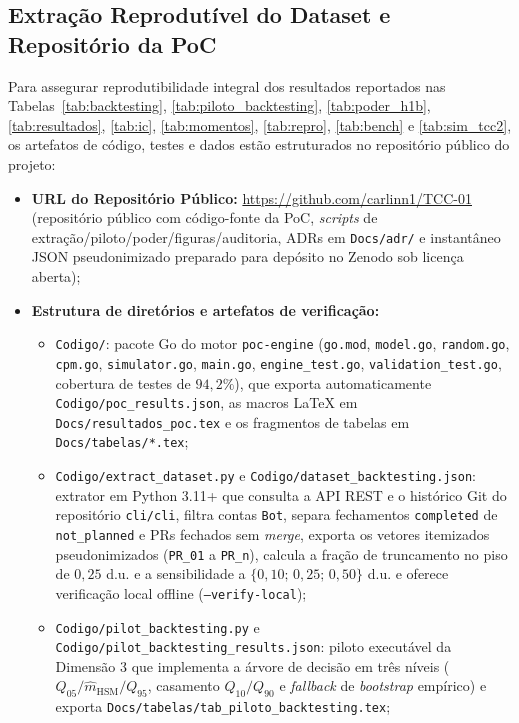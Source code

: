 \documentclass[12pt,openany,oneside,a4paper,english,brazilian,sumario=tradicional]{abntex2}
\begin{document}
\begin{apendicesenv}
\chapter{Extração Reprodutível do Dataset e Repositório da PoC}\label{apd:extracao}

Para assegurar reprodutibilidade integral dos resultados reportados nas Tabelas~\ref{tab:backtesting}, \ref{tab:piloto_backtesting}, \ref{tab:poder_h1b}, \ref{tab:resultados}, \ref{tab:ic}, \ref{tab:momentos}, \ref{tab:repro}, \ref{tab:bench} e \ref{tab:sim_tcc2}, os artefatos de código, testes e dados estão estruturados no repositório público do projeto:

\begin{itemize}
  \item \textbf{URL do Repositório Público:} \url{https://github.com/carlinn1/TCC-01} (repositório público com código-fonte da PoC, \textit{scripts} de extração/\allowbreak piloto/\allowbreak poder/\allowbreak figuras/\allowbreak auditoria, ADRs em \texttt{Docs/adr/} e instantâneo JSON pseudonimizado preparado para depósito no Zenodo sob licença aberta);
  \item \textbf{Estrutura de diretórios e artefatos de verificação:}
  \begin{itemize}
    \item \texttt{Codigo/}: pacote Go do motor \texttt{poc-engine} (\texttt{go.mod}, \texttt{model.go}, \texttt{random.go}, \texttt{cpm.go}, \texttt{simulator.go}, \texttt{main.go}, \texttt{engine\_test.go}, \texttt{validation\_test.go}, cobertura de testes de $94{,}2\%$), que exporta automaticamente \texttt{Codigo/}\allowbreak\texttt{poc\_results.json}, as macros LaTeX em \texttt{Docs/}\allowbreak\texttt{resultados\_poc.tex} e os fragmentos de tabelas em \texttt{Docs/}\allowbreak\texttt{tabelas/*.tex};
    \item \texttt{Codigo/extract\_dataset.py} e \texttt{Codigo/}\allowbreak\texttt{dataset\_backtesting.json}: extrator em Python 3.11+ que consulta a API REST e o histórico Git do repositório \texttt{cli/cli}, filtra contas \texttt{Bot}, separa fechamentos \texttt{completed} de \texttt{not\_planned} e PRs fechados sem \textit{merge}, exporta os vetores itemizados pseudonimizados (\texttt{PR\_01} a \texttt{PR\_n}), calcula a fração de truncamento no piso de $0{,}25$ d.u. e a sensibilidade a $\{0{,}10;\,0{,}25;\,0{,}50\}$ d.u. e oferece verificação local offline (\texttt{--verify-local});
    \item \texttt{Codigo/pilot\_backtesting.py} e \texttt{Codigo/}\allowbreak\texttt{pilot\_backtesting\_results.json}: piloto executável da Dimensão 3 que implementa a árvore de decisão em três níveis ($Q_{05}/\hat{m}_{\mathrm{HSM}}/Q_{95}$, casamento $Q_{10}/Q_{90}$ e \textit{fallback} de \textit{bootstrap} empírico) e exporta \texttt{Docs/}\allowbreak\texttt{tabelas/}\allowbreak\texttt{tab\_piloto\_backtesting.tex};

\end{itemize}
\end{itemize}
\end{apendicesenv}
\end{document}
